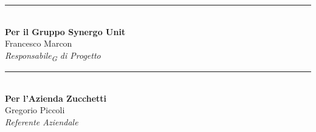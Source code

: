 \noindent
\begin{minipage}[c]{0.45\textwidth}
	\begin{center}
		\rule{6cm}{0.4pt} \\
		\vspace{0.2cm}
		\textbf{Per il Gruppo Synergo Unit} \\
		Francesco Marcon \\
		\textit{Responsabile\textsubscript{G} di Progetto}
	\end{center}
\end{minipage}
\hfill
\begin{minipage}[c]{0.45\textwidth}
	\begin{center}
		\rule{6cm}{0.4pt} \\
		\vspace{0.2cm}
		\textbf{Per l'Azienda Zucchetti} \\
		Gregorio Piccoli \\
		\textit{Referente Aziendale}
	\end{center}
\end{minipage}

\vspace{2cm}
